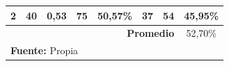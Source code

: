 \begin{landscape}
\begin{table}[H]
\begin{center}
\begin{tabular}{|c|c|c|c|c|c|c|c|}
2                & 40                                                                   & 0,53                                                                                     & 75                                                                            & 50,57\%                                                                               & 37                                                                                      & 54                                                                                      & 45,95\%                                                                                           \\ \hline
\multicolumn{7}{|r|}{\textbf{Promedio}}                                                                                                                                                                                                                                                                                                                                                                                                                                                                                                        & 52,70\%                                                                                           \\ \hline
 \multicolumn{8}{l}{\textbf{Fuente:} Propia}
\end{tabular}
\end{center}
\end{table}
\end{landscape}